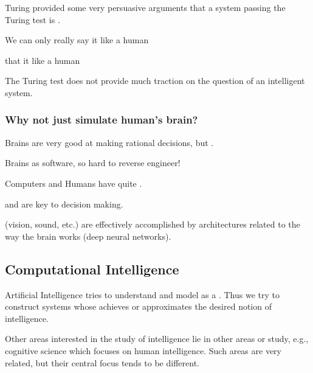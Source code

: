 \begin{listu}
    \item Turing provided some very persuasive arguments that a system passing the Turing test is .

    \begin{listu}
        \item We can only really say it  like a human
        \item {} that it  like a human
    \end{listu}

    \item The Turing test does not provide much traction on the question of  an intelligent system.
\end{listu}

\subsubsection{Why not just simulate human's brain?}

\begin{listu}
    \item Brains are very good at making rational decisions, but .
    \item Brains  as software, so hard to reverse engineer!
    \item Computers and Humans have quite .
    \begin{listu}
        \item {} and  are key to decision making.
        \item {} (vision, sound, etc.) are effectively accomplished by architectures related to the way the brain works (deep neural networks).
    \end{listu}
\end{listu}

\subsection{Computational Intelligence}

Artificial Intelligence tries to understand and model  as a . Thus we try to construct systems whose  achieves or approximates the desired notion of intelligence.

Other areas interested in the study of intelligence lie in other areas or study, e.g., cognitive science which focuses on human intelligence. Such areas are very related, but their central focus tends to be different.

